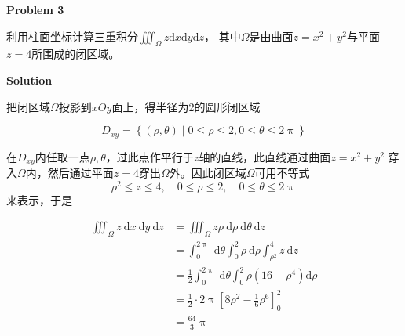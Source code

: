 \documentclass[12pt, a4paper]{article}
\numberwithin{equation}{section}
\newcommand{\rmd}{\mathrm{d}}
\begin{document}
    \textbf{Problem 3}
    \vspace{1em}

    利用柱面坐标计算三重积分${\displaystyle \iiint_\varOmega z \rmd x \rmd y \rmd z}$，
    其中$\varOmega$是由曲面$z=x^2+y^2$与平面\(z=4\)所围成的闭区域。
    \vspace{1em}

    \textbf{Solution}
    \vspace{1em}

    把闭区域\(\varOmega\)投影到\(xOy\)面上，得半径为2的圆形闭区域

    $$
    D_{x y}=\left\{(\rho, \theta) \mid 0 \leq \rho \leq 2, 0 \leq \theta \leq 2 \uppi \right\}
    $$

    在\(D_{xy}\)内任取一点\(\rho, \theta\)，过此点作平行于\(z \)轴的直线，此直线通过曲面$z=x^2+y^2$
    穿入\(\varOmega\)内，然后通过平面\(z=4\)穿出\(\varOmega\)外。因此闭区域\(\varOmega\)可用不等式
    \[\rho^2 \leq z \leq 4, \quad 0 \leq \rho \leq 2, \quad 0 \leq \theta \leq 2 \uppi\]
    来表示，于是

    $$
        \begin{aligned}
            \iiint_\varOmega z \mathrm{~d} x \mathrm{~d} y \mathrm{~d} z
            & =\iiint_\varOmega z \rho \mathrm{~d} \rho \mathrm{~d} \theta \mathrm{~d} z \\
            & =\int_0^{2 \uppi} \mathrm{~d} \theta \int_0^2 \rho \mathrm{~d} \rho \int_{\rho^2}^4 z \mathrm{~d} z \\
            & =\frac{1}{2} \int_0^{2 \uppi} \mathrm{~d} \theta \int_0^2 \rho\left(16-\rho^4\right) \mathrm{d} \rho \\
            & =\frac{1}{2} \cdot 2 \uppi\left[8 \rho^2-\frac{1}{6} \rho^6\right]_0^2 \\
            & =\frac{64}{3} \uppi
        \end{aligned}
    $$
\end{document}

